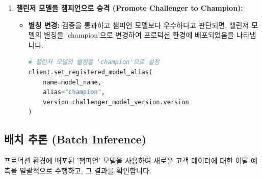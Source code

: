 \documentclass[11pt,a4paper]{article}
\begin{document}
\begin{enumerate}
    \item \textbf{챌린저 모델을 챔피언으로 승격 (Promote Challenger to Champion):}
    \begin{itemize}
        \item \textbf{별칭 변경:} 검증을 통과하고 챔피언 모델보다 우수하다고 판단되면, 챌린저 모델의 별칭을 'champion'으로 변경하여 프로덕션 환경에 배포되었음을 나타냅니다.
        \begin{lstlisting}[language=Python, caption={챌린저 모델을 챔피언으로 승격}, label={lst:promote_to_champion}]
# 챌린저 모델의 별칭을 'champion'으로 설정
client.set_registered_model_alias(
    name=model_name,
    alias="champion",
    version=challenger_model_version.version
)
\end{lstlisting}
    \end{itemize}
\end{enumerate}

\subsection{배치 추론 (Batch Inference)}

\begin{summarybox}
프로덕션 환경에 배포된 '챔피언' 모델을 사용하여 새로운 고객 데이터에 대한 이탈 예측을 일괄적으로 수행하고, 그 결과를 확인합니다.
\end{summarybox}
\end{document}
